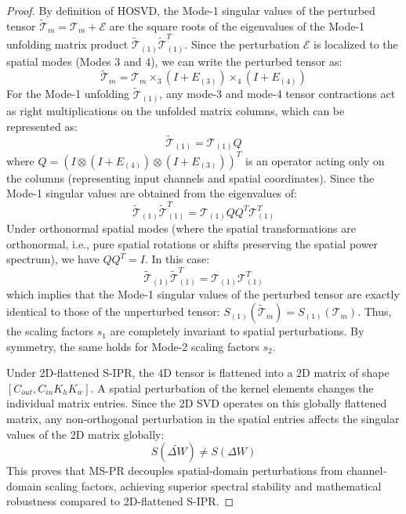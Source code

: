 \documentclass{article}
\theoremstyle{plain}
\theoremstyle{definition}
\theoremstyle{remark}
\begin{document}
\begin{proof}
By definition of HOSVD, the Mode-1 singular values of the perturbed tensor $\widetilde{\mathcal{T}}_m = \mathcal{T}_m + \mathcal{E}$ are the square roots of the eigenvalues of the Mode-1 unfolding matrix product $\widetilde{\mathcal{T}}_{(1)} \widetilde{\mathcal{T}}_{(1)}^T$. 
Since the perturbation $\mathcal{E}$ is localized to the spatial modes (Modes 3 and 4), we can write the perturbed tensor as:
\begin{equation}
    \widetilde{\mathcal{T}}_m = \mathcal{T}_m \times_3 (I + E_{(3)}) \times_4 (I + E_{(4)})
\end{equation}
For the Mode-1 unfolding $\widetilde{\mathcal{T}}_{(1)}$, any mode-3 and mode-4 tensor contractions act as right multiplications on the unfolded matrix columns, which can be represented as:
\begin{equation}
    \widetilde{\mathcal{T}}_{(1)} = \mathcal{T}_{(1)} Q
\end{equation}
where $Q = (I \otimes (I+E_{(4)}) \otimes (I+E_{(3)}))^T$ is an operator acting only on the columns (representing input channels and spatial coordinates). 
Since the Mode-1 singular values are obtained from the eigenvalues of:
\begin{equation}
    \widetilde{\mathcal{T}}_{(1)} \widetilde{\mathcal{T}}_{(1)}^T = \mathcal{T}_{(1)} Q Q^T \mathcal{T}_{(1)}^T
\end{equation}
Under orthonormal spatial modes (where the spatial transformations are orthonormal, i.e., pure spatial rotations or shifts preserving the spatial power spectrum), we have $Q Q^T = I$. In this case:
\begin{equation}
    \widetilde{\mathcal{T}}_{(1)} \widetilde{\mathcal{T}}_{(1)}^T = \mathcal{T}_{(1)} \mathcal{T}_{(1)}^T
\end{equation}
which implies that the Mode-1 singular values of the perturbed tensor are exactly identical to those of the unperturbed tensor: $S_{(1)}(\widetilde{\mathcal{T}}_m) = S_{(1)}(\mathcal{T}_m)$. Thus, the scaling factors $s_1$ are completely invariant to spatial perturbations. By symmetry, the same holds for Mode-2 scaling factors $s_2$.

Under 2D-flattened S-IPR, the 4D tensor is flattened into a 2D matrix of shape $[C_{out}, C_{in} K_h K_w]$. A spatial perturbation of the kernel elements changes the individual matrix entries. Since the 2D SVD operates on this globally flattened matrix, any non-orthogonal perturbation in the spatial entries affects the singular values of the 2D matrix globally:
\begin{equation}
    S(\widetilde{\Delta W}) \neq S(\Delta W)
\end{equation}
This proves that MS-PR decouples spatial-domain perturbations from channel-domain scaling factors, achieving superior spectral stability and mathematical robustness compared to 2D-flattened S-IPR.
\end{proof}
\end{document}
